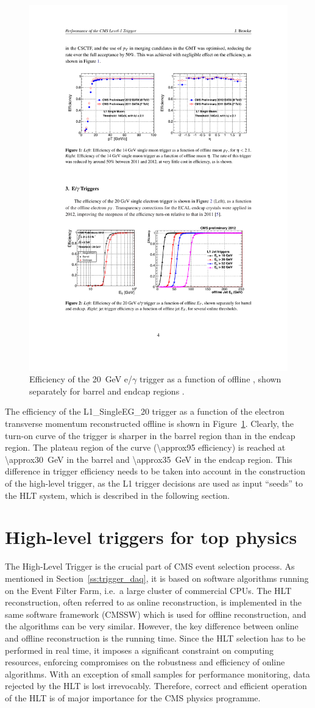 \begin{figure}[!htbp]
  \centering
  \leavevmode
  \includegraphics[width=0.5\columnwidth]{L1_turnon}
  \caption[Efficiency of the \SI{20}{\GeV} e/$\gamma$ trigger]{Efficiency of the \SI{20}{\GeV} e/$\gamma$ trigger as a
  function of offline \ET, shown separately for barrel and endcap regions \autocite{L1_Brooke}.}
  \label{fig:L1_seed_turn_on_curve}
\end{figure}

The efficiency of the L1\_SingleEG\_20 trigger as a function of the electron transverse momentum reconstructed offline
is shown in Figure~\ref{fig:L1_seed_turn_on_curve}. Clearly, the turn-on curve of the trigger is sharper in the barrel
region than in the endcap region. The plateau region of the curve (\SI{\approx95}{\pc} efficiency) is reached at
\SI{\approx30}{\GeV} in the barrel and \SI{\approx35}{\GeV} in the endcap region. This difference in trigger efficiency
needs to be taken into account in the construction of the high-level trigger, as the L1 trigger decisions are used as
input ``seeds'' to the HLT system, which is described in the following section.

\section{High-level triggers for top physics}
\label{s:hlt_for_top_physics}
The High-Level Trigger \autocite{HLT} is the crucial part of CMS event selection process. As mentioned in
Section~\ref{ss:trigger_daq}, it is based on software algorithms running on the Event Filter Farm, i.e.\ a large cluster
of commercial CPUs. The HLT reconstruction, often referred to as online reconstruction, is implemented in the same
software framework (CMSSW) which is used for offline reconstruction, and the algorithms can be very similar. However,
the key difference between online and offline reconstruction is the running time. Since the HLT selection has to be
performed in real time, it imposes a significant constraint on computing resources, enforcing compromises on the
robustness and efficiency of online algorithms. With an exception of small samples for performance monitoring, data
rejected by the HLT is lost irrevocably. Therefore, correct and efficient operation of the HLT is of major importance
for the CMS physics programme.

